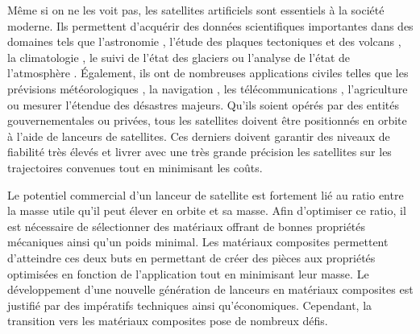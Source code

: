 \label{sec:Introduction}  %

Même si on ne les voit pas, les satellites artificiels sont essentiels à la société moderne. 
Ils permettent d'acquérir des données scientifiques importantes dans des domaines tels que l'astronomie \cite{Freedman2001}, l'étude des plaques tectoniques et des volcans \cite{Christodoulidis1985}, la climatologie \cite{Hollmann2013}, le suivi de l'état des glaciers \cite{Goldstein1993} ou l'analyse de l'état de l'atmosphère \cite{Laube2014}. 
Également, ils ont de nombreuses applications civiles telles que les prévisions météorologiques \cite{Bauer2015}, la navigation \cite{Getting1993}, les télécommunications \cite{Evans2005}, l'agriculture \cite{Lobell2002} ou mesurer l'étendue des désastres majeurs\cite{Tralli2005}.  
Qu'ils soient opérés par des entités gouvernementales ou privées, tous les satellites doivent être positionnés en orbite à l'aide de lanceurs de satellites. 
Ces derniers doivent garantir des niveaux de fiabilité très élevés et livrer avec une très grande précision les satellites sur les trajectoires convenues tout en minimisant les coûts. 

Le potentiel commercial d'un lanceur de satellite est fortement lié au ratio entre la masse utile qu'il peut élever en orbite et sa masse. 
Afin d'optimiser ce ratio, il est nécessaire de sélectionner des matériaux offrant de bonnes propriétés mécaniques ainsi qu'un poids minimal. 
Les matériaux composites permettent d'atteindre ces deux buts en permettant de créer des pièces aux propriétés optimisées en fonction de l'application tout en minimisant leur masse. 
Le développement d'une nouvelle génération de lanceurs en matériaux composites est justifié par des impératifs techniques ainsi qu'économiques. 
Cependant, la transition vers les matériaux composites pose de nombreux défis. 

